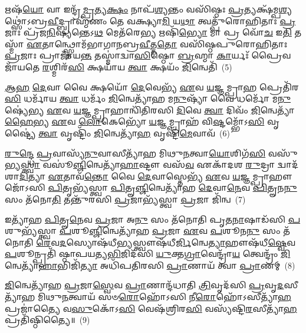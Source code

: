 {}%

𑌋𑌷᳴\-\ul{𑌯𑍋} 𑌵𑌾 𑌇𑌨𑍍𑌦𑍍𑌰᳴\-\ul{𑌮𑍍𑌪𑍍𑌰}\-𑌤𑍍𑌯\-\ul{𑌕𑍍𑌷𑌂} 𑌨𑌾𑌪᳴\-\ul{𑌶𑍍𑌯}\-𑌨𑍍𑌤𑌂 𑌵𑌸𑌿᳴𑌷𑍍𑌠𑌃 \ul{𑌪𑍍𑌰}\-𑌤𑍍𑌯𑌕𑍍𑌷᳴𑌮𑍍𑌪\-\ul{𑌶𑍍𑌯}\-𑌥𑍍𑌸𑍋॑\-𑌽𑌬𑍍𑌰\-\ul{𑌵𑍀}\-𑌦𑍍𑌬𑍍𑌰𑌾𑌹𑍍𑌮᳴𑌣𑌂 𑌤𑍇 𑌵𑌕𑍍𑌷𑍍𑌯𑌾\-\ul{𑌮𑌿} 𑌯\-\ul{𑌥𑌾} 𑌤𑍍𑌵𑌤𑍍𑌪𑍁᳴𑌰𑍋𑌹𑌿𑌤𑌾𑌃 \ul{𑌪𑍍𑌰}\-𑌜𑌾𑌃 𑌪𑍍𑌰᳴𑌜\-\ul{𑌨𑌿}\-𑌷𑍍𑌯𑌨𑍍𑌤𑍇\-𑌽\-\ul{𑌥} 𑌮𑍇𑌤᳴𑌰𑍇\-\ul{𑌭𑍍𑌯} 𑌋𑌷𑌿᳴\-\ul{𑌭𑍍𑌯𑍋} 𑌮𑌾 𑌪𑍍𑌰 𑌵𑍋᳴\-\ul{𑌚} 𑌇\-\ul{𑌤𑌿} 𑌤𑌸𑍍𑌮𑌾᳴ \ul{𑌏}\-𑌤𑌾𑌨𑍍𑌥𑍍𑌸𑍍𑌤𑍋𑌮᳴𑌭𑌾𑌗𑌾𑌨𑌬𑍍𑌰\-\ul{𑌵𑍀}\-𑌤𑍍𑌤\-\ul{𑌤𑍋} 𑌵𑌸𑌿᳴𑌷𑍍𑌠𑌪𑍁𑌰𑍋𑌹𑌿𑌤𑌾𑌃 \ul{𑌪𑍍𑌰}\-𑌜𑌾𑌃 𑌪𑍍𑌰𑌾𑌜𑌾᳴𑌯\-\ul{𑌨𑍍𑌤} 𑌤𑌸𑍍𑌮𑌾॑𑌦𑍍𑌵𑌾\-\ul{𑌸𑌿}\-𑌷𑍍𑌠𑍋 \ul{𑌬𑍍𑌰}\-𑌹𑍍𑌮𑌾 \ul{𑌕𑌾}\-𑌰𑍍𑌯𑌃᳴ 𑌪𑍍𑌰𑍈𑌵 𑌜𑌾᳴𑌯𑌤𑍇 \ul{𑌰}\-𑌶𑍍𑌮𑌿𑌰᳴\-\ul{𑌸𑌿} 𑌕𑍍𑌷𑌯𑌾᳴𑌯 \ul{𑌤𑍍𑌵𑌾} 𑌕𑍍𑌷𑌯𑌂᳴ \ul{𑌜𑌿}\-𑌨𑍍𑌵𑍇𑌤𑌿᳴~(5)

\-\ul{𑌆}\-\-\ul{𑌹} \ul{𑌦𑍇}\-𑌵𑌾 𑌵𑍈 𑌕𑍍𑌷𑌯𑍋᳴ \ul{𑌦𑍇}\-𑌵𑍇𑌭𑍍𑌯᳴ \ul{𑌏}\-𑌵 \ul{𑌯}\-𑌜𑍍𑌞𑌮𑍍𑌪𑍍𑌰𑌾\-\ul{𑌹} 𑌪𑍍𑌰𑍇𑌤𑌿᳴𑌰\-\ul{𑌸𑌿} 𑌧𑌰𑍍𑌮𑌾᳴𑌯 \ul{𑌤𑍍𑌵𑌾} 𑌧𑌰𑍍𑌮𑌂᳴ \ul{𑌜𑌿}\-𑌨𑍍𑌵𑍇𑌤𑍍𑌯𑌾᳴𑌹 𑌮\-\ul{𑌨𑍁}\-𑌷𑍍𑌯𑌾᳴ 𑌵𑍈 𑌧𑌰𑍍𑌮𑍋᳴ 𑌮\-\ul{𑌨𑍁}\-𑌷𑍍𑌯𑍇॑𑌭𑍍𑌯 \ul{𑌏}\-𑌵 \ul{𑌯}\-𑌜𑍍𑌞𑌮𑍍𑌪𑍍𑌰𑌾𑌹𑌾𑌨𑍍𑌵𑌿᳴𑌤𑌿𑌰𑌸𑌿 \ul{𑌦𑌿}\-𑌵𑍇 \ul{𑌤𑍍𑌵𑌾} 𑌦𑌿𑌵𑌂᳴ \ul{𑌜𑌿}\-𑌨𑍍𑌵𑍇𑌤𑍍𑌯𑌾᳴\-\ul{𑌹𑍈}\-𑌭𑍍𑌯 \ul{𑌏}\-𑌵 \ul{𑌲𑍋}\-𑌕𑍇𑌭𑍍𑌯𑍋᳴ \ul{𑌯}\-𑌜𑍍𑌞𑌮𑍍𑌪𑍍𑌰𑌾𑌹᳴ 𑌵𑌿\-\ul{𑌷𑍍𑌟}\-𑌮𑍍𑌭𑍋᳴\-𑌽\-\ul{𑌸𑌿} 𑌵𑍃𑌷𑍍𑌟𑍍𑌯𑍈॑ \ul{𑌤𑍍𑌵𑌾} 𑌵𑍃𑌷𑍍𑌟𑌿𑌂᳴ \ul{𑌜𑌿}\-𑌨𑍍𑌵𑍇𑌤𑍍𑌯𑌾᳴\-\ul{𑌹} 𑌵𑍃𑌷𑍍𑌟𑌿᳴\-\ul{𑌮𑍇}\-𑌵𑌾𑌵᳴~(6)

\-\ul{𑌰𑍁}\-\-\ul{𑌨𑍍𑌦𑍍𑌧𑍇} \ul{𑌪𑍍𑌰}\-𑌵𑌾𑌸𑍍𑌯᳴\-\ul{𑌨𑍁}\-𑌵𑌾𑌸𑍀𑌤𑍍𑌯𑌾᳴𑌹 𑌮𑌿𑌥𑍁\-\ul{𑌨}\-𑌤𑍍𑌵𑌾\-\ul{𑌯𑍋}\-𑌶𑌿𑌗᳴\-\ul{𑌸𑌿} 𑌵𑌸𑍁᳴𑌭𑍍𑌯\-\ul{𑌸𑍍𑌤𑍍𑌵𑌾} 𑌵𑌸𑍂॑\-\ul{𑌞𑍍𑌜𑌿}\-𑌨𑍍𑌵𑍇𑌤𑍍𑌯𑌾᳴\-\ul{𑌹𑌾}\-𑌷𑍍𑌟𑍗 𑌵𑌸᳴\-\ul{𑌵} 𑌏𑌕𑌾᳴\-𑌦𑌶 \ul{𑌰𑍁}\-𑌦𑍍𑌰𑌾 𑌦𑍍𑌵𑌾𑌦᳴𑌶𑌾\-\ul{𑌦𑌿}\-𑌤𑍍𑌯𑌾 \ul{𑌏}\-𑌤𑌾𑌵᳴\-\ul{𑌨𑍍𑌤𑍋} 𑌵𑍈 \ul{𑌦𑍇}\-𑌵𑌾𑌸𑍍𑌤𑍇𑌭𑍍𑌯᳴ \ul{𑌏}\-𑌵 \ul{𑌯}\-𑌜𑍍𑌞𑌮𑍍𑌪𑍍𑌰𑌾𑌹𑍗𑌜𑍋᳴\-𑌽𑌸𑌿 \ul{𑌪𑌿}\-𑌤𑍃𑌭𑍍𑌯᳴𑌸𑍍𑌤𑍍𑌵𑌾 \ul{𑌪𑌿}\-𑌤𑍄\-\ul{𑌞𑍍𑌜𑌿}\-𑌨𑍍𑌵𑍇𑌤𑍍𑌯𑌾᳴𑌹 \ul{𑌦𑍇}\-𑌵𑌾\-\ul{𑌨𑍇}\-𑌵 \ul{𑌪𑌿}\-𑌤𑍄𑌨\-\ul{𑌨𑍁} 𑌸𑌂 𑌤᳴𑌨𑍋\-\ul{𑌤𑌿} 𑌤𑌨𑍍𑌤𑍁᳴𑌰𑌸𑌿 \ul{𑌪𑍍𑌰}\-𑌜𑌾𑌭𑍍𑌯᳴𑌸𑍍𑌤𑍍𑌵𑌾 \ul{𑌪𑍍𑌰}\-𑌜𑌾 𑌜𑌿᳴𑌨𑍍𑌵~(7)

𑌇𑌤𑍍𑌯𑌾᳴𑌹 \ul{𑌪𑌿}\-𑌤𑍄\-\ul{𑌨𑍇}\-𑌵 \ul{𑌪𑍍𑌰}\-𑌜𑌾 𑌅\-\ul{𑌨𑍁} 𑌸𑌂 𑌤᳴𑌨𑍋𑌤𑌿 𑌪𑍃𑌤\-\ul{𑌨𑌾}\-𑌷𑌾𑌡᳴𑌸𑌿 \ul{𑌪}\-𑌶𑍁𑌭𑍍𑌯᳴𑌸𑍍𑌤𑍍𑌵𑌾 \ul{𑌪}\-𑌶𑍂\-\ul{𑌞𑍍𑌜𑌿}\-𑌨𑍍𑌵𑍇𑌤𑍍𑌯𑌾᳴𑌹 \ul{𑌪𑍍𑌰}\-𑌜𑌾 \ul{𑌏}\-𑌵 \ul{𑌪}\-𑌶𑍂𑌨\-\ul{𑌨𑍁} 𑌸𑌂 𑌤᳴𑌨𑍋𑌤𑌿 \ul{𑌰𑍇}\-𑌵\-\ul{𑌦}\-𑌸𑍍𑌯𑍋𑌷᳴𑌧𑍀\-\ul{𑌭𑍍𑌯}\-𑌸𑍍𑌤𑍍𑌵𑍗𑌷᳴𑌧𑍀\-\ul{𑌰𑍍𑌜𑌿}\-𑌨𑍍𑌵𑍇\-\ul{𑌤𑍍𑌯𑌾}\-𑌹𑍗𑌷᳴𑌧𑍀\-\ul{𑌷𑍍𑌵𑍇}\-𑌵 \ul{𑌪}\-𑌶𑍂𑌨𑍍𑌪𑍍𑌰𑌤𑌿᳴ 𑌷𑍍𑌠𑌾𑌪𑌯𑌤𑍍𑌯\-\ul{𑌭𑌿}\-𑌜𑌿𑌦᳴𑌸𑌿 \ul{𑌯𑍁}\-𑌕𑍍𑌤\-\ul{𑌗𑍍𑌰𑌾}\-𑌵𑍇𑌨𑍍𑌦𑍍𑌰𑌾᳴\-\ul{𑌯} 𑌤𑍍𑌵𑍇𑌨𑍍𑌦𑍍𑌰𑌂᳴ \ul{𑌜𑌿}\-𑌨𑍍𑌵𑍇𑌤𑍍𑌯𑌾᳴\-\ul{𑌹𑌾}\-𑌭𑌿𑌜𑌿᳴\-\ul{𑌤𑍍𑌯𑌾} 𑌅𑌧𑌿᳴𑌪𑌤𑌿𑌰𑌸𑌿 \ul{𑌪𑍍𑌰𑌾}\-𑌣𑌾𑌯᳴ 𑌤𑍍𑌵𑌾 \ul{𑌪𑍍𑌰𑌾}\-𑌣𑌮𑍍~(8)

\-\ul{𑌜𑌿}\-𑌨𑍍𑌵𑍇𑌤𑍍𑌯𑌾᳴𑌹 \ul{𑌪𑍍𑌰}\-𑌜𑌾\-\ul{𑌸𑍍𑌵𑍇}\-𑌵 \ul{𑌪𑍍𑌰𑌾}\-𑌣𑌾𑌨𑍍𑌦᳴𑌧𑌾𑌤𑌿 \ul{𑌤𑍍𑌰𑌿}\-𑌵𑍃𑌦᳴𑌸𑌿 \ul{𑌪𑍍𑌰}\-𑌵𑍃\-\ul{𑌦}\-𑌸𑍀𑌤𑍍𑌯𑌾᳴𑌹 𑌮𑌿𑌥𑍁\-\ul{𑌨}\-𑌤𑍍𑌵𑌾𑌯᳴ 𑌸𑍞\-\ul{𑌰𑍋}\-𑌹𑍋᳴\-𑌽𑌸𑌿 𑌨𑍀\-\ul{𑌰𑍋}\-𑌹𑍋᳴\-𑌽𑌸𑍀𑌤𑍍𑌯𑌾᳴\-\ul{𑌹} 𑌪𑍍𑌰𑌜𑌾॑𑌤𑍍𑌯𑍈 𑌵\-\ul{𑌸𑍁}\-𑌕𑍋᳴\-𑌽\-\ul{𑌸𑌿} 𑌵𑍇𑌷᳴𑌶𑍍𑌰𑌿𑌰\-\ul{𑌸𑌿} 𑌵𑌸𑍍𑌯᳴𑌷𑍍𑌟𑌿\-\ul{𑌰}\-𑌸𑍀𑌤𑍍𑌯𑌾᳴\-\ul{𑌹} 𑌪𑍍𑌰𑌤𑌿᳴𑌷𑍍𑌠𑌿𑌤𑍍𑌯𑍈॥~(9)

